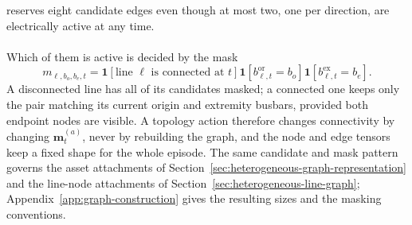 reserves eight candidate edges even though at most two, one per direction, are
electrically active at any time.
\\
\\
Which of them is active is decided by the mask
\begin{equation}
  m_{\ell,b_o,b_e,t}=
  \mathbf{1}\!\left[\text{line }\ell\text{ is connected at }t\right]
  \mathbf{1}\!\left[b^{\mathrm{or}}_{\ell,t}=b_o\right]
  \mathbf{1}\!\left[b^{\mathrm{ex}}_{\ell,t}=b_e\right].
  \label{eq:physical-edge-mask}
\end{equation}
A disconnected line has all of its candidates masked; a connected one keeps
only the pair matching its current origin and extremity busbars, provided both
endpoint nodes are visible. A topology action therefore changes connectivity
by changing $\mathbf{m}^{(a)}_t$, never by rebuilding the graph, and the node
and edge tensors keep a fixed shape for the whole episode. The same candidate
and mask pattern governs the asset attachments of
Section~\ref{sec:heterogeneous-graph-representation} and the line-node
attachments of Section~\ref{sec:heterogeneous-line-graph};
Appendix~\ref{app:graph-construction} gives the resulting sizes and the
masking conventions.

